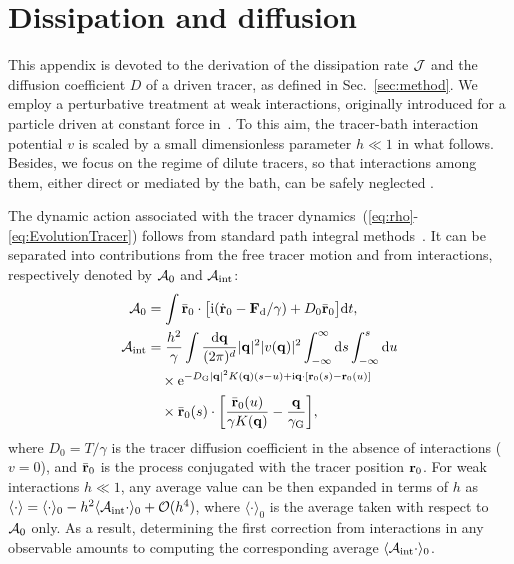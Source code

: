 \documentclass[pre, superscriptaddress, twocolumn,pre]{revtex4-1}
\begin{document}


\appendix

\section{Dissipation and diffusion}\label{app:diff}

This appendix is devoted to the derivation of the dissipation rate $\cal J$ and the diffusion coefficient $D$ of a driven tracer, as defined in Sec.~\ref{sec:method}. We employ a perturbative treatment at weak interactions, originally introduced for a particle driven at constant force in~\cite{Demery2011, Demery2014}. To this aim, the tracer-bath interaction potential $v$ is scaled by a small dimensionless parameter $h\ll1$ in what follows. Besides, we focus on the regime of dilute tracers, so that interactions among them, either direct or mediated by the bath, can be safely neglected .


The dynamic action associated with the tracer dynamics~(\ref{eq:rho}-\ref{eq:EvolutionTracer}) follows from standard path integral methods~\cite{Martin1973, Dominicis1975}. It can be separated into contributions from the free tracer motion and from interactions, respectively denoted by ${\cal A}_0$ and ${\cal A}_{\rm int}$:
\begin{equation}\label{eq:action}
	\begin{aligned}
		{\cal A}_0 &= \int \bar{\bf r}_0 \cdot \big[ {\rm i}(\dot{\bf r}_0 - {\bf F}_{\rm d}/\gamma) + D_0 \bar{\bf r}_0 \big] {\rm d}t ,
		\\
		{\cal A}_{\rm int} &= \frac{h^2}{\gamma} \int \frac{{\rm d}{\bf q}}{(2\pi)^d} |{\bf q}|^2 |v({\bf q})|^2 \int_{-\infty}^\infty {\rm d}s\int_{-\infty}^s{\rm d}u
		\\
		&\quad\times {\rm e}^{-D_{\rm G}|{\bf q}|^2K({\bf q})(s-u)+{\rm i}{\bf q}\cdot[{\bf r}_0(s)-{\bf r}_0(u)]}
		\\
		&\quad\times \bar{\bf r}_0(s) \cdot \bigg[ \frac{\bar{\bf r}_0(u)}{\gamma K({\bf q})} - \frac{{\bf q}}{\gamma_{\rm G}} \bigg] ,
	\end{aligned}
\end{equation}
where $D_0=T/\gamma$ is the tracer diffusion coefficient in the absence of interactions ($v=0$), and $\bar{\bf r}_0$ is the process conjugated with the tracer position ${\bf r}_0$. For weak interactions $h\ll1$, any average value can be then expanded in terms of $h$ as $\langle\cdot\rangle=\langle\cdot\rangle_0 - h^2 \langle{\cal A}_{\rm int}\cdot\rangle_0 + {\cal O}(h^4)$, where $\langle\cdot\rangle_0$ is the average taken with respect to ${\cal A}_0$ only. As a result, determining the first correction from interactions in any observable amounts to computing the corresponding average $\langle{\cal A}_{\rm int}\cdot\rangle_0$.
\end{document}
